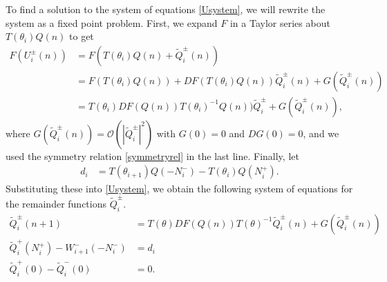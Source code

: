 \documentclass[12pt]{elsarticle}
\begin{document}
To find a solution to the system of equations \cref{Usystem}, we will rewrite the system as a fixed point problem. First, we expand $F$ in a Taylor series about $T(\theta_i) Q(n)$ to get
\begin{align*}
F(U_i^\pm(n)) &= F(T(\theta_i) Q(n) + \tilde{Q}_i^\pm(n)) \\
&= F(T(\theta_i) Q(n)) + D F(T(\theta_i) Q(n)) \tilde{Q}_i^\pm(n) + G(\tilde{Q}_i^\pm(n)) \\
&= T(\theta_i)DF(Q(n))T(\theta_i)^{-1} Q(n)) \tilde{Q}_i^\pm + G(\tilde{Q}_i^\pm(n)),
\end{align*}
where $G(\tilde{Q}_i^\pm(n)) = \mathcal{O}(|\tilde{Q}_i^\pm|^2)$ with $G(0) = 0$ and $DG(0) = 0$, and we used the symmetry relation \cref{symmetryrel} in the last line. Finally, let
\begin{align} \label{didef}
d_i &= T(\theta_{i+1}) Q(-N_i^-) - T(\theta_i) Q(N_i^+).
\end{align}
Substituting these into \cref{Usystem}, we obtain the following system of equations for the remainder functions $\tilde{Q}_i^\pm$.
\begin{align}
\tilde{Q}_i^\pm(n+1) &= T(\theta)D F(Q(n))T(\theta)^{-1} \tilde{Q}_i^\pm(n) + G(\tilde{Q}_i^\pm(n)) \label{Wsystem1} \\
\tilde{Q}_i^+(N_i^+) - W_{i+1}^-(-N_i^-) &= d_i \label{Wsystem2} \\
\tilde{Q}_i^+(0) - \tilde{Q}_i^-(0) &= 0 . \label{Wsystem3}
\end{align}
\end{document}
